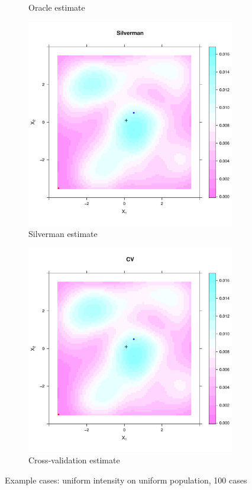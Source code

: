 \begin{figure}[tb]
\begin{subfigure}[t]{0.45\textwidth}
    \caption{Oracle estimate}
    \end{subfigure}
    \begin{subfigure}[b]{0.45\textwidth}
    \includegraphics[width=\textwidth]{results/unif_100_unif/output/silverman_intensity_heatmap}
    \caption{Silverman estimate}
    \end{subfigure}
    \begin{subfigure}[b]{0.45\textwidth}
    \includegraphics[width=\textwidth]{results/unif_100_unif/output/CV_intensity_heatmap}
    \caption{Cross-validation estimate}
    \end{subfigure}
    \label{fig:cases:unif_100_unif}
    \caption{Example cases: uniform intensity on uniform population, 100 cases}
\end{figure}

